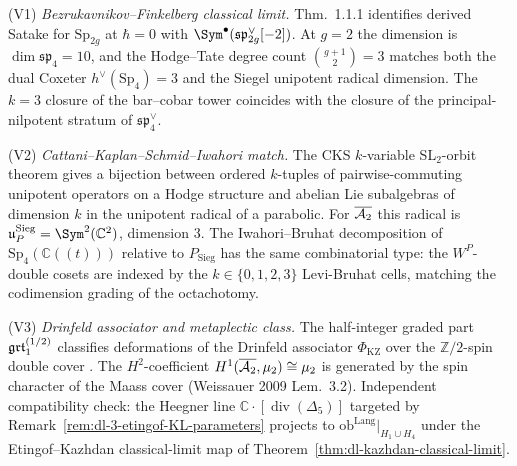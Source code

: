 \begin{remark}
\label{rem:dl-octa-sat-three-paths}
%
\textup{(V1)} \emph{Bezrukavnikov--Finkelberg classical limit.}
\cite{BezrukavnikovFinkelberg2008} Thm.~1.1.1 identifies derived
Satake for $\mathrm{Sp}_{2g}$ at $\hbar=0$ with
$\Sym^\bullet(\mathfrak{sp}_{2g}^\vee[-2])$. At $g=2$ the dimension
is $\dim\mathfrak{sp}_4=10$, and the Hodge--Tate degree count
$\binom{g+1}{2}=3$ matches both the dual Coxeter
$h^\vee(\mathrm{Sp}_4)=3$ and the Siegel unipotent radical
dimension. The $k=3$ closure of the bar--cobar tower coincides with
the closure of the principal-nilpotent stratum of
$\mathfrak{sp}_4^\vee$.

\textup{(V2)} \emph{Cattani--Kaplan--Schmid--Iwahori match.}
The CKS $k$-variable SL$_2$-orbit theorem
\cite[Thm.~3.3]{CattaniKaplanSchmid1986} gives a bijection between
ordered $k$-tuples of pairwise-commuting unipotent operators on a
Hodge structure and abelian Lie subalgebras of dimension $k$ in the
unipotent radical of a parabolic. For $\overline{\mathcal{A}_2}$ this radical is
$\mathfrak{u}_P^{\mathrm{Sieg}}=\Sym^2(\mathbb{C}^2)$, dimension
$3$. The Iwahori--Bruhat decomposition of
$\mathrm{Sp}_4(\mathbb{C}((t)))$ relative to $P_{\mathrm{Sieg}}$ has
the same combinatorial type: the $W^P$-double cosets are indexed by
the $k\in\{0,1,2,3\}$ Levi-Bruhat cells, matching the codimension
grading of the octachotomy.

\textup{(V3)} \emph{Drinfeld associator and metaplectic class.}
The half-integer graded part $\mathfrak{grt}_1^{(1/2)}$ classifies
deformations of the Drinfeld associator
$\Phi_{\mathrm{KZ}}$ over the $\mathbb{Z}/2$-spin double cover
\cite[\S 5]{EnriquezEtingof2005}. The $H^2$-coefficient
$H^1(\overline{\mathcal{A}_2},\mu_2)\cong\mu_2$ is generated by the spin character
of the Maass cover (Weissauer 2009 Lem.~3.2). Independent
compatibility check: the Heegner line
$\mathbb C\cdot[\operatorname{div}(\Delta_5)]$ targeted by
Remark~\ref{rem:dl-3-etingof-KL-parameters} projects to
$\mathrm{ob}^{\mathrm{Lang}}|_{H_1\cup H_4}$ under the
Etingof--Kazhdan classical-limit map of
Theorem~\ref{thm:dl-kazhdan-classical-limit}.
\end{remark}

